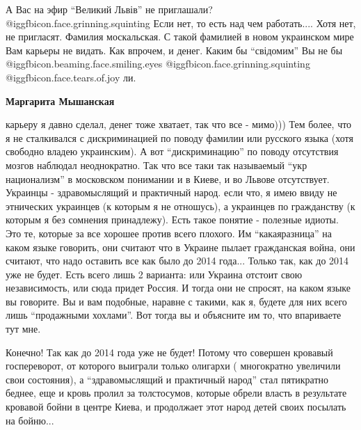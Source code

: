 \begin{itemize}
\begin{itemize}
\begin{itemize}
\end{itemize} %


А Вас на эфир \enquote{Великий Львів} не приглашали?
@igg{fbicon.face.grinning.squinting}  Если нет, то есть над чем работать....
Хотя нет, не пригласят. Фамилия москальская. С такой фамилией в новом
украинском мире Вам карьеры не видать. Как впрочем, и денег. Каким бы
\enquote{свідомим} Вы не бы @igg{fbicon.beaming.face.smiling.eyes}
@igg{fbicon.face.grinning.squinting}  @igg{fbicon.face.tears.of.joy} ли.

\begin{itemize} %
\textbf{Маргарита Мышанская} 

карьеру я давно сделал, денег тоже хватает, так что все - мимо))) Тем более,
что я не сталкивался с дискриминацией по поводу фамилии или русского языка
(хотя свободно владею украинским). А вот \enquote{дискриминацию} по поводу отсутствия
мозгов наблюдал неоднократно. Так что все таки так называемый \enquote{укр национализм}
в московском понимании и в Киеве, и во Львове отсутствует. Украинцы -
здравомыслящий и практичный народ. если что, я имею ввиду не этнических
украинцев (к которым я не отношусь), а украинцев по гражданству (к которым я
без сомнения принадлежу). Есть такое понятие - полезные идиоты. Это те, которые
за все хорошее против всего плохого. Им \enquote{какаяразница} на каком языке говорить,
они считают что в Украине пылает гражданская война, они считают, что надо
оставить все как было до 2014 года... Только так, как до 2014 уже не будет.
Есть всего лишь 2 варианта: или Украина отстоит свою независимость, или сюда
придет Россия. И тогда они не спросят, на каком языке вы говорите. Вы и вам
подобные, наравне с такими, как я, будете для них всего лишь \enquote{продажными
хохлами}. Вот тогда вы и объясните им то, что впариваете тут мне.

\end{itemize} %


Конечно! Так как до 2014 года уже не будет! Потому что совершен кровавый
госпереворот, от которого выиграли только олигархи ( многократно увеличили свои
состояния), а \enquote{здравомыслящий и практичный народ} стал пятикратно
беднее, еще и кровь пролил за толстосумов, которые обрели власть в результате
кровавой бойни в центре Киева, и продолжает этот народ детей своих посылать на
бойню...


\end{itemize} %


\end{itemize} %
